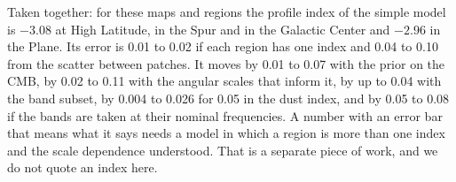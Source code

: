 Taken together: for these maps and regions the profile index of the simple model is $-3.08$ at High
Latitude, in the Spur and in the Galactic Center and $-2.96$ in the Plane. Its error is 0.01 to 0.02
if each region has one index and 0.04 to 0.10 from the scatter between patches. It moves by
0.01 to 0.07 with the prior on the CMB, by 0.02 to 0.11 with the angular scales that
inform it, by up to 0.04 with the band subset, by 0.004 to 0.026 for 0.05 in the dust index, and by
0.05 to 0.08 if the bands are taken at their nominal frequencies. A number with an error bar that
means what it says needs a model in which a region is more than one index and the scale dependence
understood. That is a separate piece of work, and we do not quote an index here.
